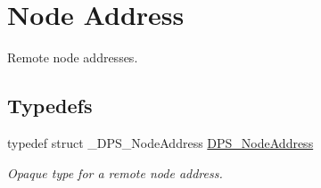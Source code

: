 \hypertarget{group__nodeaddress}{}\section{Node Address}
\label{group__nodeaddress}


Remote node addresses.  


\subsection*{Typedefs}
\begin{DoxyCompactItemize}
\item 
\mbox{\label{group__nodeaddress_ga9e9f56aa38e82b4edcef7eb81e9f5bd2}} 
typedef struct \+\_\+\+D\+P\+S\+\_\+\+Node\+Address \hyperlink{group__nodeaddress_ga9e9f56aa38e82b4edcef7eb81e9f5bd2}{D\+P\+S\+\_\+\+Node\+Address}
\begin{DoxyCompactList}\small\item\em Opaque type for a remote node address. \end{DoxyCompactList}\end{DoxyCompactItemize}
